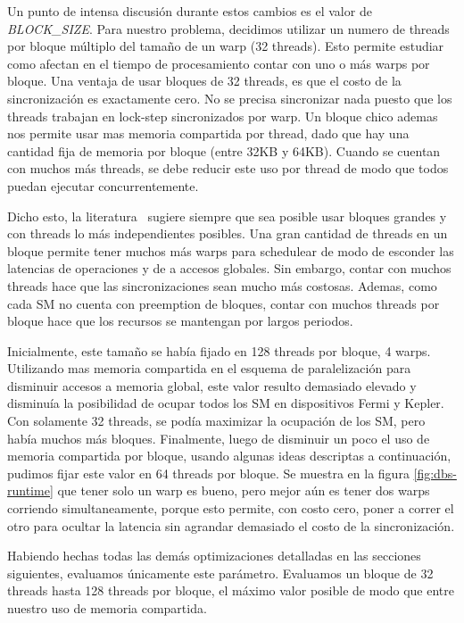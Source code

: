 Un punto de intensa discusi\'on durante estos cambios es el valor de \textit{BLOCK\_SIZE}.
Para nuestro problema, decidimos utilizar un numero de threads por bloque m\'ultiplo del
tama\~no de un warp (32 threads). Esto permite estudiar como afectan en el tiempo de
procesamiento contar con uno o m\'as warps por bloque. Una ventaja de usar bloques de
32 threads, es que el costo de la sincronizaci\'on es exactamente cero. No se precisa
sincronizar nada puesto que los threads trabajan en lock-step sincronizados por warp.
Un bloque chico ademas nos permite usar mas memoria compartida por thread, dado que hay una
cantidad fija de memoria por bloque (entre 32KB y 64KB). Cuando se cuentan con muchos m\'as
threads, se debe reducir este uso por thread de modo que todos puedan ejecutar concurrentemente.

Dicho esto, la literatura~\cite{farberCuda} sugiere siempre que sea posible
usar bloques grandes y con threads lo m\'as independientes posibles. Una gran cantidad de threads
en un bloque permite tener muchos m\'as warps para schedulear de modo de esconder las latencias de
operaciones y de a accesos globales. Sin embargo, contar con muchos threads hace que las
sincronizaciones sean mucho m\'as costosas. Ademas, como cada SM no cuenta con preemption
de bloques, contar con muchos threads por bloque hace que los recursos se mantengan
por largos periodos.

Inicialmente, este tama\~no se hab\'ia fijado en 128 threads por bloque, 4 warps. Utilizando
mas memoria compartida en el esquema de paralelizaci\'on para disminuir accesos a memoria global,
este valor resulto demasiado elevado y disminu\'ia la posibilidad de ocupar todos los SM en dispositivos
Fermi y Kepler. Con solamente 32 threads, se pod\'ia maximizar la ocupaci\'on de los SM, pero hab\'ia
muchos m\'as bloques. Finalmente, luego de disminuir un poco el uso de memoria compartida por
bloque, usando algunas ideas descriptas a continuaci\'on, pudimos fijar este valor en 64 threads
por bloque. Se muestra en la figura \ref{fig:dbs-runtime} que tener solo un warp es bueno, pero
mejor a\'un es tener dos warps corriendo simultaneamente, porque
esto permite, con costo cero, poner a correr el otro para ocultar la latencia sin agrandar
demasiado el costo de la sincronizaci\'on.

Habiendo hechas todas las dem\'as optimizaciones detalladas en las secciones siguientes, evaluamos
\'unicamente este par\'ametro. Evaluamos un bloque de 32 threads hasta 128 threads por bloque,
el m\'aximo valor posible de modo que entre nuestro uso de memoria compartida.

